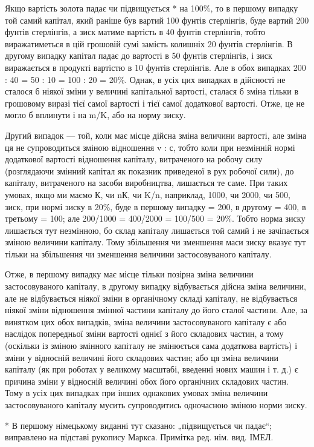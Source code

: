 Якщо вартість золота падає чи підвищується * на 100\%, то
в першому випадку той самий капітал, який раніше був вартий
100 фунтів стерлінгів, буде вартий 200 фунтів стерлінгів, а зиск
матиме вартість в 40 фунтів стерлінгів, тобто виражатиметься
в цій грошовій сумі замість колишніх 20 фунтів стерлінгів.
В другому випадку капітал падає до вартості в 50 фунтів
стерлінгів, і зиск виражається в продукті вартістю в 10 фунтів
стерлінгів. Але в обох випадках 200 : 40 = 50 : 10 = 100 : 20 = 20\%.
Однак, в усіх цих випадках в дійсності не сталося б ніякої
зміни у величині капітальної вартості, сталася б зміна тільки
в грошовому виразі тієї самої вартості і тієї самої додаткової
вартості. Отже, це не могло б вплинути і на m/K, або на норму
зиску.

Другий випадок — той, коли має місце дійсна зміна величини
вартості, але зміна ця не супроводиться зміною відношення
v : с, тобто коли при незмінній нормі додаткової вартості відношення
капіталу, витраченого на робочу силу (розглядаючи
змінний капітал як показник приведеної в рух робочої сили), до
капіталу, витраченого на засоби виробництва, лишається те
саме. При таких умовах, якщо ми маємо К, чи nК, чи K/n, наприклад,
1000, чи 2000, чи 500, зиск, при нормі зиску в 20\%,
буде в першому випадку = 200, в другому = 400, в третьому = 100;
але 200/1000 = 400/2000 = 100/500 = 20\%. Тобто норма зиску лишається тут
незмінною, бо склад капіталу лишається той самий і не зачіпається
зміною величини капіталу. Тому збільшення чи зменшення
маси зиску вказує тут тільки на збільшення чи зменшення
величини застосовуваного капіталу.

Отже, в першому випадку має місце тільки позірна зміна
величини застосовуваного капіталу, в другому випадку відбувається
дійсна зміна величини, але не відбувається ніякої зміни
в органічному складі капіталу, не відбувається ніякої зміни
відношення змінної частини капіталу до його сталої частини.
Але, за винятком цих обох випадків, зміна величини застосовуваного
капіталу є або наслідок попередньої зміни вартості
однієї з його складових частин, а тому (оскільки із зміною змінного
капіталу не змінюється сама додаткова вартість) і зміни
у відносній величині його складових частин; або ця зміна величини
капіталу (як при роботах у великому масштабі, введенні нових
машин і т. д.) є причина зміни у відносній величині обох його
органічних складових частин. Тому в усіх цих випадках при
інших однакових умовах зміна величини застосовуваного капіталу
мусить супроводитись одночасною зміною норми зиску.

* В першому німецькому виданні тут сказано: „підвищується чи падає“;
виправлено на підставі рукопису Маркса. Примітка ред. нім. вид. ІМЕЛ.
